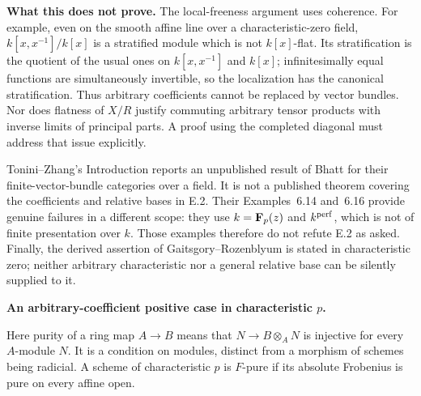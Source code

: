 \par\smallskip\noindent\textbf{What this does not prove.}
The local-freeness argument uses coherence.  For example, even on the smooth affine line over a characteristic-zero field, $k[x,x^{-1}]/k[x]$ is a stratified module which is not $k[x]$-flat.  Its stratification is the quotient of the usual ones on $k[x,x^{-1}]$ and $k[x]$; infinitesimally equal functions are simultaneously invertible, so the localization has the canonical stratification.  Thus arbitrary coefficients cannot be replaced by vector bundles.  Nor does flatness of $X/R$ justify commuting arbitrary tensor products with inverse limits of principal parts.  A proof using the completed diagonal must address that issue explicitly.

Tonini--Zhang's Introduction reports an unpublished result of Bhatt for their finite-vector-bundle categories over a field.  It is not a published theorem covering the coefficients and relative bases in E.2.  Their Examples~6.14 and~6.16 provide genuine failures in a different scope: they use $k=\mathbf F_p(z)$ and $k^{\rm perf}$, which is not of finite presentation over $k$.  Those examples therefore do not refute E.2 as asked.  Finally, the derived assertion of Gaitsgory--Rozenblyum is stated in characteristic zero; neither arbitrary characteristic nor a general relative base can be silently supplied to it.


\par\smallskip\noindent\textbf{An arbitrary-coefficient positive case in characteristic $p$.}

Here purity of a ring map $A\to B$ means that $N\to B\otimes_A N$ is injective for every $A$-module $N$.  It is a condition on modules, distinct from a morphism of schemes being radicial.  A scheme of characteristic $p$ is $F$-pure if its absolute Frobenius is pure on every affine open.

